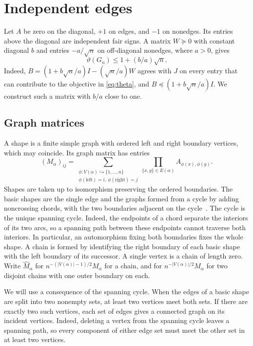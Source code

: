 \documentclass[preprints,article,submit,oneauthor]{Definitions/mdpi}
\newcommand{\abs}[1]{\lvert #1\rvert}
\begin{document}
\section{Independent edges}\label{sec:independent}

Let \(A\) be zero on the diagonal, \(+1\) on edges, and \(-1\) on
nonedges. Its entries above the diagonal are independent fair signs.
A matrix \(W\succeq0\) with constant diagonal \(b\) and entries
\(-a/\sqrt n\) on off-diagonal nonedges, where \(a>0\), gives
\begin{equation}\label{eq:witness}
 \vartheta(G_n)\le 1+(b/a)\sqrt n.
\end{equation}
Indeed, \(B=(1+b\sqrt n/a)I-(\sqrt n/a)W\) agrees with \(J\) on every
entry that can contribute to the objective in \eqref{eq:theta}, and
\(B\preceq(1+b\sqrt n/a)I\). We construct such a matrix with \(b/a\)
close to one.

\subsection{Graph matrices}

A shape is a finite simple graph with ordered left and right boundary
vertices, which may coincide. Its graph matrix has entries
\[
 (M_\alpha)_{ij}=
 \sum_{\substack{\phi:V(\alpha)\hookrightarrow\{1,\ldots,n\}\\
                 \phi(\mathrm{left})=i,\ \phi(\mathrm{right})=j}}
          \prod_{\{x,y\}\in E(\alpha)} A_{\phi(x),\phi(y)}.
\]
Shapes are taken up to isomorphism preserving the ordered boundaries.
The basic shapes are the single edge and the graphs formed from a cycle
by adding noncrossing chords, with the two boundaries adjacent on the
cycle~\cite{PX}. The cycle is the unique spanning cycle. Indeed, the
endpoints of a chord separate the interiors of its two arcs, so a
spanning path between these endpoints cannot traverse both interiors.
In particular, an automorphism fixing both boundaries fixes the whole
shape. A chain is formed by identifying the right boundary of each
basic shape with the left boundary of its successor. A single vertex
is a chain of length zero. Write \(\widehat M_\alpha\) for
\(n^{-(\abs{V(\alpha)}-1)/2}M_\alpha\) for a chain, and for
\(n^{-\abs{V(\alpha)}/2}M_\alpha\) for two disjoint chains with one
outer boundary on each.

We will use a consequence of the spanning cycle. When the edges of a
basic shape are split into two nonempty sets, at least two vertices
meet both sets. If there are exactly two such vertices, each set of
edges gives a connected graph on its incident vertices. Indeed,
deleting a vertex from the spanning cycle leaves a spanning path, so
every component of either edge set must meet the other set in at least
two vertices.
\end{document}
